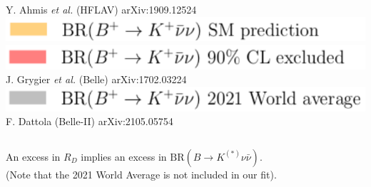 \documentclass[mathserif, 10pt, dvipsnames]{beamer}
\newcommand\colorcite[1]{{\scriptsize\color{blue}#1}}
\begin{document}
\begin{frame}
\begin{center}
\begin{columns}[onlytextwidth]
\begin{column}{0.45\textwidth}
                \colorcite{Y. Ahmis \textit{et al.} (HFLAV) arXiv:1909.12524}\\[4pt]
                \includegraphics[width=\textwidth]{figures/RD_BKnunu_leg4.pdf}\\[2pt]
                \includegraphics[width=\textwidth]{figures/RD_BKnunu_leg5.pdf}\\[-6pt]
                \colorcite{J. Grygier \textit{et al.} (Belle) arXiv:1702.03224}\\[4pt]
                \includegraphics[width=\textwidth]{figures/RD_BKnunu_leg6.pdf}\\[-6pt]
                \colorcite{F. Dattola (Belle-II) arXiv:2105.05754}
            \end{column}
        \end{columns}

    \end{center}

    An excess in $R_D$ implies an excess in $\mathrm{BR}(B\to K^{(*)}\nu\bar{\nu})$. \\(Note that the {\color{gray}2021 World Average} is not included in our fit).

\end{frame}
\end{document}
